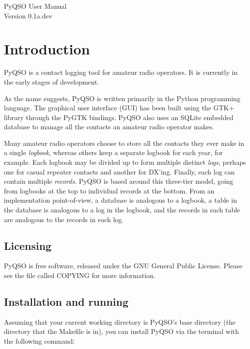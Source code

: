 \documentclass[11pt, a4paper]{report}
\begin{document}
\begin{titlepage}
\begin{center}
\vspace*{5cm}
\huge{PyQSO User Manual}\\\vspace*{5cm}
\LARGE{Version 0.1a.dev}
\end{center}
\end{titlepage}

\tableofcontents

\chapter{Introduction}
PyQSO is a contact logging tool for amateur radio operators. It is currently in the early stages of development.

As the name suggests, PyQSO is written primarily in the Python programming language. The graphical user interface (GUI) has been built using the GTK+ library through the PyGTK bindings. PyQSO also uses an SQLite embedded database to manage all the contacts an amateur radio operator makes.

Many amateur radio operators choose to store all the contacts they ever make in a single \textit{logbook}, whereas others keep a separate logbook for each year, for example. Each logbook may be divided up to form multiple distinct \textit{logs}, perhaps one for casual repeater contacts and another for DX'ing. Finally, each log can contain multiple \textit{records}. PyQSO is based around this three-tier model, going from logbooks at the top to individual records at the bottom. From an implementation point-of-view, a database is analogous to a logbook, a table in the database is analogous to a log in the logbook, and the records in each table are analogous to the records in each log.

\section{Licensing}
PyQSO is free software, released under the GNU General Public License. Please see the file called COPYING for more information.

\section{Installation and running}
Assuming that your current working directory is PyQSO's base directory (the directory that the Makefile is in), you can install PyQSO via the terminal with the following command:
\end{document}
